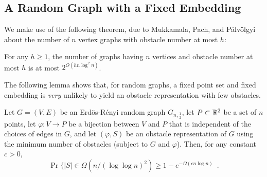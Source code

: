 \documentclass{patmorin}
\begin{document}
\subsection{A Random Graph with a Fixed Embedding}

We make use of the following theorem, due to Mukkamala, Pach, and
P\'alv\"olgyi \cite[Theorem~1]{mukkamala.pach.ea:lower} about the number
of $n$ vertex graphs with obstacle number at most $h$:
\begin{thm}
  For any $h\ge 1$, the number of graphs having $n$ vertices and
  obstacle number at most $h$ is at most $2^{O(hn\log^2 n)}$.
\end{thm}

The following lemma shows that, for random graphs, a fixed point
set and fixed embedding is \emph{very} unlikely to yield an obstacle
representation with few obstacles.

\begin{lem}
  Let $G=(V,E)$ be an Erd\"os-R\'enyi random graph $G_{n,\frac{1}{2}}$,
  let $P\subset\mathbb{R}^2$ be a set of $n$ points, let
  $\varphi:V\rightarrow P$ be a bijection between $V$ and $P$ that is
  independent of the choices of edges in $G$, and let $(\varphi, S)$ be
  an obstacle representation of $G$ using the minimum number of obstacles
  (subject to $G$ and $\varphi$).  Then, for any constant $c>0$,
  \[
     \Pr\{|S| \in \Omega(n/(\log\log n)^2) \ge 1-e^{-\Omega(cn\log n)}  \enspace .
  \] 
\end{lem}
\end{document}
